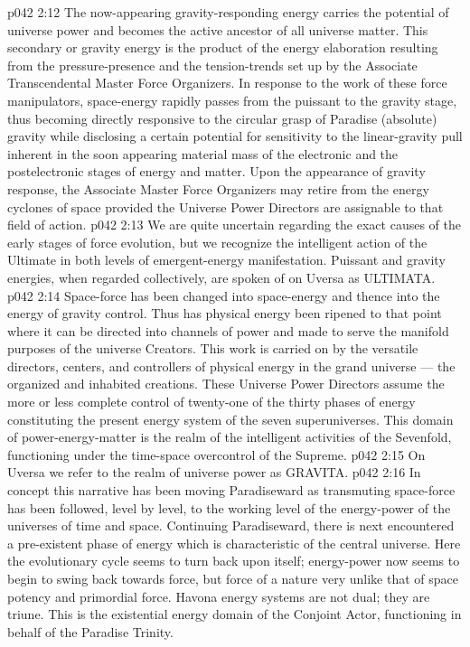 \vs p042 2:12 \pc {}\bibnobreakspace {} The now\hyp{}appearing gravity\hyp{}responding energy carries the potential of universe power and becomes the active ancestor of all universe matter. This secondary or gravity energy is the product of the energy elaboration resulting from the pressure\hyp{}presence and the tension\hyp{}trends set up by the Associate Transcendental Master Force Organizers. In response to the work of these force manipulators, space\hyp{}energy rapidly passes from the puissant to the gravity stage, thus becoming directly responsive to the circular grasp of Paradise (absolute) gravity while disclosing a certain potential for sensitivity to the linear\hyp{}gravity pull inherent in the soon appearing material mass of the electronic and the postelectronic stages of energy and matter. Upon the appearance of gravity response, the Associate Master Force Organizers may retire from the energy cyclones of space provided the Universe Power Directors are assignable to that field of action.
\vs p042 2:13 \pc We are quite uncertain regarding the exact causes of the early stages of force evolution, but we recognize the intelligent action of the Ultimate in both levels of emergent\hyp{}energy manifestation. Puissant and gravity energies, when regarded collectively, are spoken of on Uversa as ULTIMATA.
\vs p042 2:14 \pc {}\bibnobreakspace {} Space\hyp{}force has been changed into space\hyp{}energy and thence into the energy of gravity control. Thus has physical energy been ripened to that point where it can be directed into channels of power and made to serve the manifold purposes of the universe Creators. This work is carried on by the versatile directors, centers, and controllers of physical energy in the grand universe --- the organized and inhabited creations. These Universe Power Directors assume the more or less complete control of twenty\hyp{}one of the thirty phases of energy constituting the present energy system of the seven superuniverses. This domain of power\hyp{}energy\hyp{}matter is the realm of the intelligent activities of the Sevenfold, functioning under the time\hyp{}space overcontrol of the Supreme.
\vs p042 2:15 On Uversa we refer to the realm of universe power as GRAVITA.
\vs p042 2:16 \pc {}\bibnobreakspace {} In concept this narrative has been moving Paradiseward as transmuting space\hyp{}force has been followed, level by level, to the working level of the energy\hyp{}power of the universes of time and space. Continuing Paradiseward, there is next encountered a pre\hyp{}existent phase of energy which is characteristic of the central universe. Here the evolutionary cycle seems to turn back upon itself; energy\hyp{}power now seems to begin to swing back towards force, but force of a nature very unlike that of space potency and primordial force. Havona energy systems are not dual; they are triune. This is the existential energy domain of the Conjoint Actor, functioning in behalf of the Paradise Trinity.
